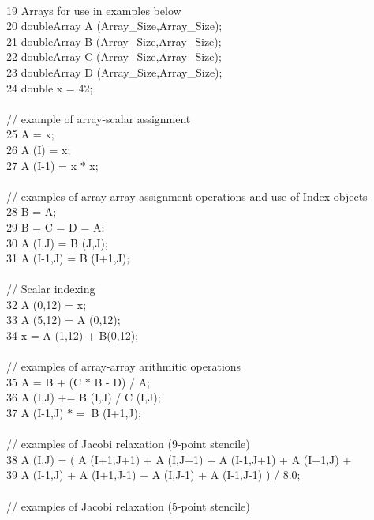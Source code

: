 {\begin{tabbing}
    \\
19  \>\> Arrays for use in examples below \\
20  \>\> doubleArray A (Array\_Size,Array\_Size); \\ 
21  \>\> doubleArray B (Array\_Size,Array\_Size); \\ 
22  \>\> doubleArray C (Array\_Size,Array\_Size); \\ 
23  \>\> doubleArray D (Array\_Size,Array\_Size); \\ 
24  \>\> double x = 42; \\ 
    \\
    \> // example of array-scalar assignment \\
25  \>\> A = x; \\
26  \>\> A (I) = x; \\
27  \>\> A (I-1) = x $*$ x; \\
    \\
    \> // examples of array-array assignment operations and use of Index objects \\
28  \>\> B = A; \\
29  \>\> B = C = D = A; \\
30  \>\> A (I,J) = B (J,J); \\
31  \>\> A (I-1,J) = B (I+1,J); \\
    \\
    \> // Scalar indexing \\
32  \>\> A (0,12) = x; \\
33  \>\> A (5,12) = A (0,12); \\
34  \>\> x = A (1,12) + B(0,12); \\
    \\
    \> // examples of array-array arithmitic operations \\
35  \>\> A = B + (C $*$ B - D) / A; \\
36  \>\> A (I,J) += B (I,J) / C (I,J); \\
37  \>\> A (I-1,J) $*=$ B (I+1,J); \\
    \\
    \> // examples of Jacobi relaxation (9-point stencile) \\
38  \>\> A (I,J) = ( A (I+1,J+1) + A (I,J+1) + A (I-1,J+1) + A (I+1,J) + \\ 
39  \>\>\>           A (I-1,J) + A (I+1,J-1) + A (I,J-1) + A (I-1,J-1) ) / 8.0; \\
    \\
    \> // examples of Jacobi relaxation (5-point stencile) \\

\end{tabbing}}
